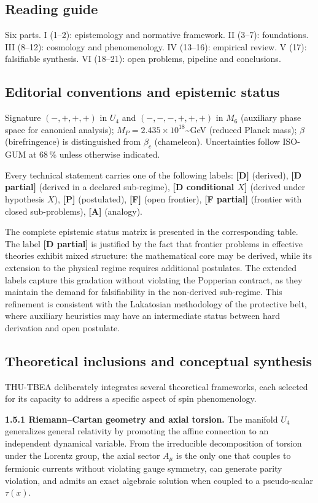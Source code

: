 ﻿\documentclass[11pt,letterpaper]{article}
\begin{document}
\subsection{Reading guide}
Six parts. I (1--2): epistemology and normative framework. II (3--7): foundations. III (8--12): cosmology and phenomenology. IV (13--16): empirical review. V (17): falsifiable synthesis. VI (18--21): open problems, pipeline and conclusions.
\subsection{Editorial conventions and epistemic status}
Signature $(-,+,+,+)$ in $U_4$ and $(-,-,-,+,+,+)$ in $M_6$ (auxiliary phase space for canonical analysis); $M_P = 2{.}435 \times 10^{18}$\textasciitilde{}GeV (reduced Planck mass); $\beta$ (birefringence) is distinguished from $\beta_c$ (chameleon). Uncertainties follow ISO-GUM at 68\,\% unless otherwise indicated.

Every technical statement carries one of the following labels: \textbf{[D]} (derived), \textbf{[D partial]} (derived in a declared sub-regime), \textbf{[D conditional $X$]} (derived under hypothesis $X$), \textbf{[P]} (postulated), \textbf{[F]} (open frontier), \textbf{[F partial]} (frontier with closed sub-problems), \textbf{[A]} (analogy).

The complete epistemic status matrix is presented in the corresponding table. The label \textbf{[D partial]} is justified by the fact that frontier problems in effective theories exhibit mixed structure: the mathematical core may be derived, while its extension to the physical regime requires additional postulates. The extended labels capture this gradation without violating the Popperian contract, as they maintain the demand for falsifiability in the non-derived sub-regime. This refinement is consistent with the Lakatosian methodology of the protective belt, where auxiliary heuristics may have an intermediate status between hard derivation and open postulate.
\subsection{Theoretical inclusions and conceptual synthesis}
THU-TBEA deliberately integrates several theoretical frameworks, each selected for its capacity to address a specific aspect of spin phenomenology.

\textbf{1.5.1 Riemann--Cartan geometry and axial torsion.} The manifold $U_4$ generalizes general relativity by promoting the affine connection to an independent dynamical variable. From the irreducible decomposition of torsion under the Lorentz group, the axial sector $A_\mu$ is the only one that couples to fermionic currents without violating gauge symmetry, can generate parity violation, and admits an exact algebraic solution when coupled to a pseudo-scalar $\tau(x)$.
\end{document}
